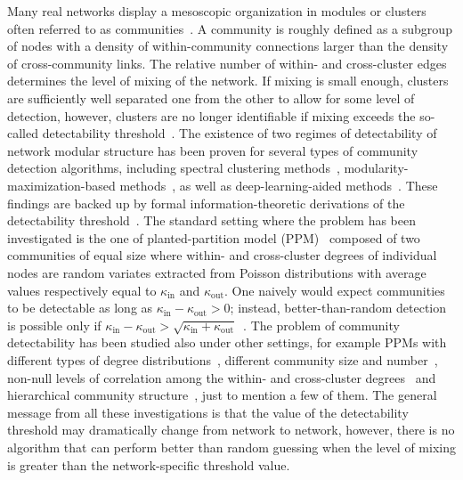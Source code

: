 \documentclass[a4paper,pre,superscriptaddress,floatfix,nofootinbib,twocolumn]{revtex4-1}
\begin{document}
Many real networks display a mesoscopic organization
in modules or clusters often referred to as communities~\cite{fortunato2010community}. A
community is roughly defined as a subgroup of nodes with a
density of within-community connections
larger than the density of cross-community links.
The relative number of within- and cross-cluster edges determines the level of mixing of the
network. If mixing is small enough, clusters are
sufficiently well separated one from the other to allow for some level of detection, however,
clusters are no longer identifiable if mixing exceeds the so-called
detectability threshold~\cite{reichardt2008detectable, decelle2011inference}.
The existence of two regimes of detectability of network modular structure
has been proven for several types of community detection algorithms, including
spectral clustering methods~\cite{nadakuditi2012graph, radicchi2013detectability, krzakala2013spectral, chen2015universal},
modularity-maximization-based methods~\cite{radicchi2014paradox},
as well as deep-learning-aided methods~\cite{kojaku2024network}.
These findings are backed up by
formal information-theoretic derivations of the detectability threshold~\cite{abbe2015community, abbe2016crossing, abbe2018community}.
The standard setting where the problem has been investigated is the one of
planted-partition model (PPM)~\cite{condon2001algorithms}
composed of two communities of equal size
where within- and cross-cluster degrees of individual nodes are random variates extracted
from Poisson distributions with average
values respectively equal to $\kappa_\text{in}$ and $\kappa_\text{out}$.
One naively would expect communities to be detectable as long as
$\kappa_\text{in} - \kappa_\text{out} > 0$; instead, better-than-random
detection is possible only
if $\kappa_\text{in} - \kappa_\text{out} > \sqrt{\kappa_\text{in} + \kappa_\text{out}}$~\cite{decelle2011inference}.
The problem of community detectability has been studied also under other settings, for example PPMs with different types of degree distributions~\cite{radicchi2013detectability},
different community size and number~\cite{decelle2011inference, abbe2016crossing}, non-null levels of correlation among the within- and cross-cluster degrees~\cite{radicchi2014paradox}
and hierarchical community structure~\cite{peel2024detectability}, just to mention a few of them.
The general message from all these investigations is that the value of the detectability threshold
may dramatically change from network to network, however, there is no algorithm that can
perform better than random guessing when the level of mixing is greater than the
network-specific threshold value.
\end{document}
